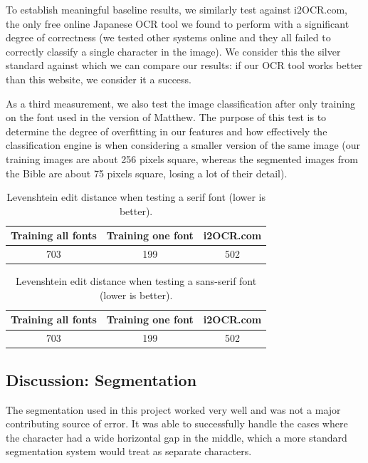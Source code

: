\documentclass[10pt,twocolumn,letterpaper]{article}
\begin{document}
To establish meaningful baseline results, we similarly test against i2OCR.com, the only free online Japanese OCR tool we found to perform with a significant degree of correctness (we tested other systems online and they all failed to correctly classify a single character in the image). We consider this the silver standard against which we can compare our results: if our OCR tool works better than this website, we consider it a success.

As a third measurement, we also test the image classification after only training on the font used in the version of Matthew. The purpose of this test is to determine the degree of overfitting in our features and how effectively the classification engine is when considering a smaller version of the same image (our training images are about 256 pixels square, whereas the segmented images from the Bible are about 75 pixels square, losing a lot of their detail).

\begin{table}
    \centering
    \begin{tabular}{|c|c|c|}
        \hline
        Training all fonts & Training one font & i2OCR.com \\
        \hline
        703 & 199 & 502 \\
        \hline
    \end{tabular}
    \caption{Levenshtein edit distance when testing a serif font (lower is better).}
\end{table}

\begin{table}
    \centering
    \begin{tabular}{|c|c|c|}
        \hline
        Training all fonts & Training one font & i2OCR.com \\
        \hline
        703 & 199 & 502 \\
        \hline
    \end{tabular}
    \caption{Levenshtein edit distance when testing a sans-serif font (lower is better).}
\end{table}

\subsection{Discussion: Segmentation}
The segmentation used in this project worked very well and was not a major contributing source of error. It was able to successfully handle the cases where the character had a wide horizontal gap in the middle, which a more standard segmentation system would treat as separate characters.
\end{document}
